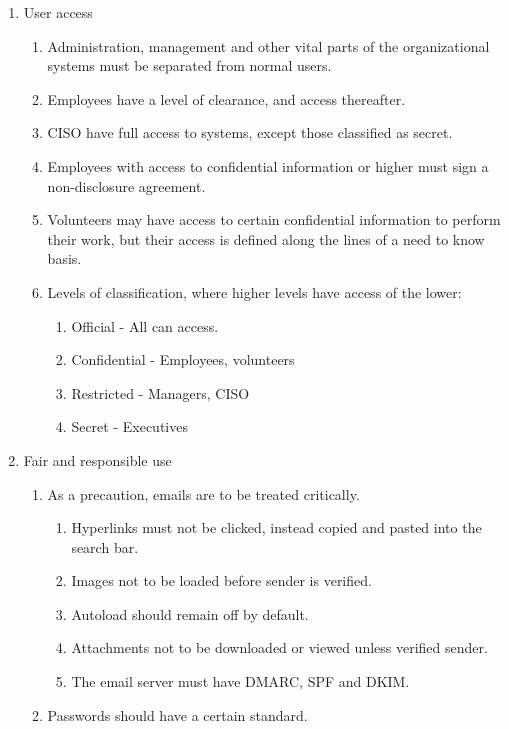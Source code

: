 \begin{enumerate}
  \item User access
  \begin{enumerate}
    \item Administration, management and other vital parts of the organizational systems must be separated from normal users.
    \item Employees have a level of clearance, and access thereafter. 
    \item CISO have full access to systems, except those classified as secret.
    \item Employees with access to confidential information or higher must sign a non-disclosure agreement.
    \item Volunteers may have access to certain confidential information to perform their work, but their access is defined along the lines of a need to know basis.
    \item Levels of classification, where higher levels have access of the lower:
    \begin{enumerate}
      \item Official - All can access.
      \item Confidential - Employees, volunteers
      \item Restricted - Managers, CISO
      \item Secret - Executives
    \end{enumerate}
  \end{enumerate}
  \item Fair and responsible use
  \begin{enumerate}
    \item As a precaution, emails are to be treated critically.
    \begin{enumerate}
      \item Hyperlinks must not be clicked, instead copied and pasted into the search bar.
      \item Images not to be loaded before sender is verified.
      \item Autoload should remain off by default.
      \item Attachments not to be downloaded or viewed unless verified sender.
      \item The email server must have DMARC, SPF and DKIM.
    \end{enumerate}
    \item Passwords should have a certain standard.
    \begin{enumerate}

\end{enumerate}
\end{enumerate}
\end{enumerate}
